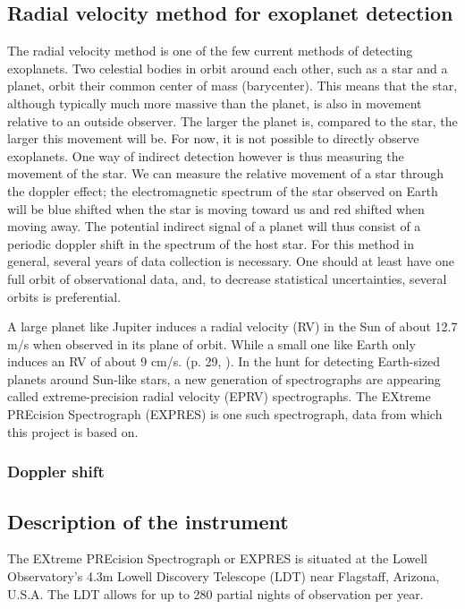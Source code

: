 \subsection{Radial velocity method for exoplanet detection}
The radial velocity method is one of the few current methods of detecting exoplanets. Two celestial bodies in orbit around each other, such as a star and a planet, orbit their common center of mass (barycenter). This means that the star, although typically much more massive than the planet, is also in movement relative to an outside observer. The larger the planet is, compared to the star, the larger this movement will be. For now, it is not possible to directly observe exoplanets. One way of indirect detection however is thus measuring the movement of the star. We can measure the relative movement of a star through the doppler effect; the electromagnetic spectrum of the star observed on Earth will be blue shifted when the star is moving toward us and red shifted when moving away. The potential indirect signal of a planet will thus consist of a periodic doppler shift in the spectrum of the host star. For this method in general, several years of data collection is necessary. One should at least have one full orbit of observational data, and, to decrease statistical uncertainties, several orbits is preferential.

A large planet like Jupiter induces a radial velocity (RV) in the Sun of about 12.7 m/s when observed in its plane of orbit. While a small one like Earth only induces an RV of about 9 cm/s. (p. 29, \cite{radial_velocity_techniques}). In the hunt for detecting Earth-sized planets around Sun-like stars, a new generation of spectrographs are appearing called extreme-precision radial velocity (EPRV) spectrographs. The EXtreme PREcision Spectrograph (EXPRES) is one such spectrograph, data from which this project is based on. 

\vspace{0.5cm}

\subsubsection{Doppler shift}




\subsection{Description of the instrument}
The EXtreme PREcision Spectrograph or EXPRES is situated at the Lowell Observatory's 4.3m Lowell Discovery Telescope (LDT) near Flagstaff, Arizona, U.S.A. The LDT allows for up to 280 partial nights of observation per year. 

